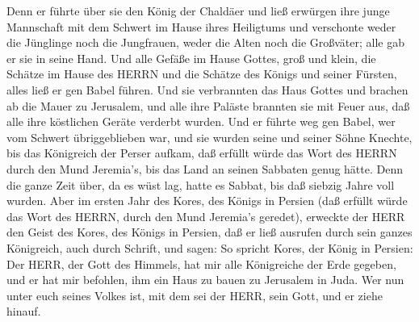 Denn er führte über sie den König der Chaldäer und ließ erwürgen ihre
junge Mannschaft mit dem Schwert im Hause ihres Heiligtums und
verschonte weder die Jünglinge noch die Jungfrauen, weder die Alten noch
die Großväter; alle gab er sie in seine Hand.  Und alle
Gefäße im Hause Gottes, groß und klein, die Schätze im Hause des HERRN
und die Schätze des Königs und seiner Fürsten, alles ließ er gen Babel
führen.  Und sie verbrannten das Haus Gottes und brachen ab
die Mauer zu Jerusalem, und alle ihre Paläste brannten sie mit Feuer
aus, daß alle ihre köstlichen Geräte verderbt wurden.  Und
er führte weg gen Babel, wer vom Schwert übriggeblieben war, und sie
wurden seine und seiner Söhne Knechte, bis das Königreich der Perser
aufkam,  daß erfüllt würde das Wort des HERRN durch den
Mund Jeremia's, bis das Land an seinen Sabbaten genug hätte. Denn die
ganze Zeit über, da es wüst lag, hatte es Sabbat, bis daß siebzig Jahre
voll wurden.  Aber im ersten Jahr des Kores, des Königs in
Persien (daß erfüllt würde das Wort des HERRN, durch den Mund Jeremia's
geredet), erweckte der HERR den Geist des Kores, des Königs in Persien,
daß er ließ ausrufen durch sein ganzes Königreich, auch durch Schrift,
und sagen:  So spricht Kores, der König in Persien: Der
HERR, der Gott des Himmels, hat mir alle Königreiche der Erde gegeben,
und er hat mir befohlen, ihm ein Haus zu bauen zu Jerusalem in Juda. Wer
nun unter euch seines Volkes ist, mit dem sei der HERR, sein Gott, und
er ziehe hinauf.
